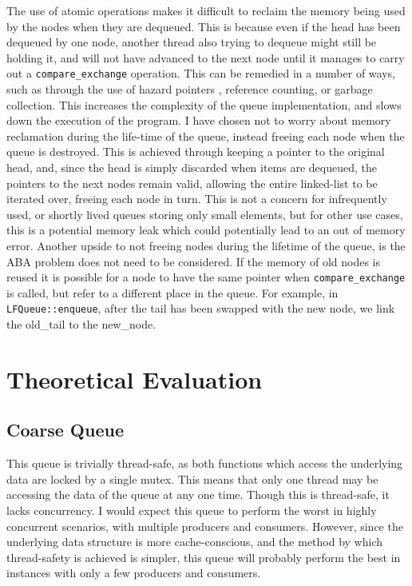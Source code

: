 \documentclass{article}
\begin{document}
The use of atomic operations makes it difficult to reclaim the memory being used
by the nodes when they are dequeued. This is because even if the head has been
dequeued by one node, another thread also trying to dequeue might still be
holding it, and will not have advanced to the next node until it manages to
carry out a \verb|compare_exchange| operation. This can be remedied in a number
of ways, such as through the use of hazard pointers \citep{michael2004hazard},
reference counting, or garbage collection. This increases the complexity of the
queue implementation, and slows down the execution of the program. I have chosen
not to worry about memory reclamation during the life-time of the queue, instead
freeing each node when the queue is destroyed. This is achieved through keeping
a pointer to the original head, and, since the head is simply discarded when
items are dequeued, the pointers to the next nodes remain valid, allowing the
entire linked-list to be iterated over, freeing each node in turn. This is not a
concern for infrequently used, or shortly lived queues storing only small
elements, but for other use cases, this is a potential memory leak which could
potentially lead to an out of memory error. Another upside to not freeing nodes
during the lifetime of the queue, is the ABA problem does not need to be
considered. If the memory of old nodes is reused it is possible for a node to
have the same pointer when \verb|compare_exchange| is called, but refer to a
different place in the queue. For example, in \verb|LFQueue::enqueue|, after the
tail has been swapped with the new node, we link the old\_tail to the new\_node.

\section{Theoretical Evaluation}
\subsection{Coarse Queue}
This queue is trivially thread-safe, as both functions which access the
underlying data are locked by a single mutex. This means that only one thread
may be accessing the data of the queue at any one time. Though this is
thread-safe, it lacks concurrency. I would expect this queue to perform the
worst in highly concurrent scenarios, with multiple producers and consumers.
However, since the underlying data structure is more cache-conscious, and the
method by which thread-safety is achieved is simpler, this queue will probably
perform the best in instances with only a few producers and consumers.
\end{document}
